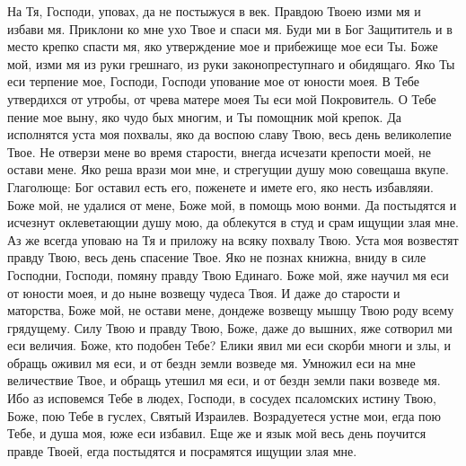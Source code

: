 

На Тя, Господи, уповах, да не постыжуся в век. Правдою Твоею изми мя и избави мя. Приклони ко мне ухо Твое и спаси мя. Буди ми в Бог Защититель и в место крепко спасти мя, яко утверждение мое и прибежище мое еси Ты. Боже мой, изми мя из руки грешнаго, из руки законопреступнаго и обидящаго. Яко Ты еси терпение мое, Господи, Господи упование мое от юности моея. В Тебе утвердихся от утробы, от чрева матере моея Ты еси мой Покровитель. О Тебе пение мое выну, яко чудо бых многим, и Ты помощник мой крепок. Да исполнятся уста моя похвалы, яко да воспою славу Твою, весь день великолепие Твое. Не отверзи мене во время старости, внегда исчезати крепости моей, не остави мене. Яко реша врази мои мне, и стрегущии душу мою совещаша вкупе. Глаголюще: Бог оставил есть его, поженете и имете его, яко несть избавляяи. Боже мой, не удалися от мене, Боже мой, в помощь мою вонми. Да постыдятся и исчезнут оклеветающии душу мою, да облекутся в студ и срам ищущии злая мне. Аз же всегда уповаю на Тя и приложу на всяку похвалу Твою. Уста моя возвестят правду Твою, весь день спасение Твое. Яко не познах книжна, вниду в силе Господни, Господи, помяну правду Твою Единаго. Боже мой, яже научил мя еси от юности моея, и до ныне возвещу чудеса Твоя. И даже до старости и маторства, Боже мой, не остави мене, дондеже возвещу мышцу Твою роду всему грядущему. Силу Твою и правду Твою, Боже, даже до вышних, яже сотворил ми еси величия. Боже, кто подобен Тебе? Елики явил ми еси скорби многи и злы, и обращь оживил мя еси, и от бездн земли возведе мя. Умножил еси на мне величествие Твое, и обращь утешил мя еси, и от бездн земли паки возведе мя. Ибо аз исповемся Тебе в людех, Господи, в сосудех псаломских истину Твою, Боже, пою Тебе в гуслех, Святый Израилев. Возрадуетеся устне мои, егда пою Тебе, и душа моя, юже еси избавил. Еще же и язык мой весь день поучится правде Твоей, егда постыдятся и посрамятся ищущии злая мне.




